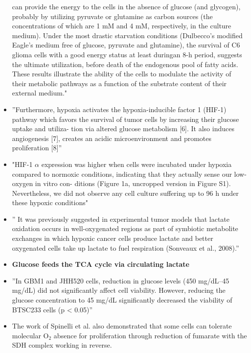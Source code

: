 \documentclass[11pt,a4paper]{article}
\begin{document}
\begin{itemize}
can provide the energy to the cells in the absence of glucose (and glycogen), probably by utilizing pyruvate or glutamine as carbon sources (the concentrations of which are
1 mM and 4 mM, respectively, in the culture medium). Under the most drastic starvation conditions (Dulbecco’s modified Eagle’s medium free of glucose, pyruvate and glutamine), the survival of C6 glioma cells with a good energy status at least duringan
8-h period, suggests the ultimate utilization, before death of the endogenous pool of fatty acids. These results illustrate the ability of the cells to modulate the activity of
their metabolic pathways as a function of the substrate content of their external medium."\cite{Piannet1991}
\item ”Furthermore, hypoxia activates the hypoxia-inducible factor 1 (HIF-1) pathway which favors the survival of tumor cells by increasing their glucose uptake and utiliza-
tion via altered glucose metabolism [6]. It also induces angiogenesis [7], creates an acidic microenvironment and promotes proliferation [8]”\cite{Shen2018}
\item "HIF-1 $\alpha$ expression was higher when cells were incubated under hypoxia compared
to normoxic conditions, indicating that they actually sense our low-oxygen in vitro con-
ditions (Figure 1a, uncropped version in Figure S1). Nevertheless, we did not observe
any cell culture suffering up to 96 h under these hypoxic conditions"\cite{Bailleul2021}
\item ” It was previously suggested in experimental tumor models that lactate oxidation occurs in well-oxygenated regions as part of symbiotic metabolite exchanges in which hypoxic cancer cells produce lactate and better oxygenated cells take up lactate to fuel respiration (Sonveaux et al., 2008).”\cite{Faubert2017}
 \item \textbf{Glucose feeds the TCA cycle via circulating lactate}  \cite{Hui2017}
 \item ”In GBM1 and JHH520 cells, reduction in glucose levels (450 mg/dL–45 mg/dL) did not significantly affect cell viability. However, reducing the glucose concentration to
45 mg/dL significantly decreased the viability of BTSC233 cells (p < 0.05)” \cite{Yusuf2022}
\item The work of Spinelli et al. also demonstrated that some cells can tolerate molecular O$_{2}$ absence for proliferation through reduction of fumarate with the SDH complex working in reverse. \cite{Spinelli2021}
\end{itemize}
\end{document}
